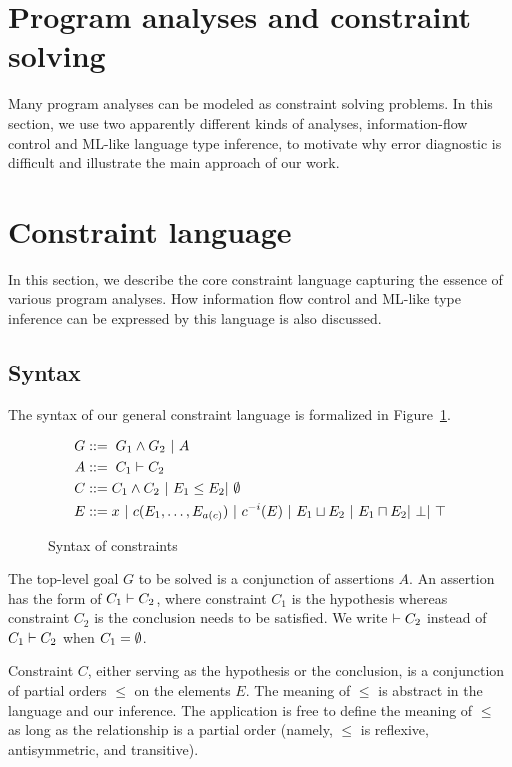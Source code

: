 \section{Program analyses and constraint solving}

Many program analyses can be modeled as constraint solving problems. In this
section, we use two apparently different kinds of analyses, information-flow
control and ML-like language type inference, to motivate why error diagnostic
is difficult and illustrate the main approach of our work.


\section{Constraint language}
\label{sec:language}

In this section, we describe the core constraint language capturing the essence
of various program analyses. How information flow control and ML-like type
inference can be expressed by this language is also discussed. 

\subsection{Syntax}

The syntax of our general constraint language is formalized in
Figure~\ref{figure:lang:syntax}.

\begin{figure}
\begin{align*}
G &::=\; G_1 \land G_2\ |\ A \\
A &::=\; C_1 \vdash C_2 \\
C &::= C_1 \land C_2\ |\  E_1 \leq E_2 |\ \emptyset \\
E &::= x\ |\ c(E_1,\dots,E_{a(c)})\ |\ c^{-i}(E)\ |\ E_1 \sqcup E_2 \
|\ E_1 \sqcap E_2 |\ \bot |\ \top
\end{align*}
\caption{Syntax of constraints}
\label{figure:lang:syntax}
\end{figure}

The top-level goal $G$ to be solved is a conjunction of assertions $A$. An
assertion has the form of $C_1 \vdash C_2$, where constraint $C_1$ is the
hypothesis whereas constraint $C_2$ is the conclusion needs to be satisfied. We
write $ \vdash C_2$ instead of $ C_1 \vdash C_2$ when $C_1=\emptyset$.

Constraint $C$, either serving as the hypothesis or the conclusion, is a
conjunction of partial orders $\leq$ on the elements $E$. The meaning
of $\leq$ is abstract in the language and our inference. The
application is free to define the meaning of $\leq$ as long as the
relationship is a partial order (namely, $\leq$ is reflexive,
antisymmetric, and transitive).

